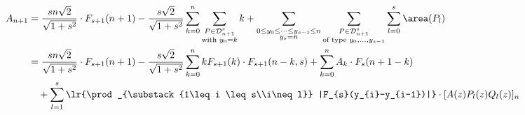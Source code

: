 \documentclass[12pt]{article}
\begin{document}
\begin{align*}
    A_{n+1} &= \frac{sn \sqrt{2}}{\sqrt{1+s^{2}}}\cdot F_{s+1}(n+1) - \frac{s \sqrt{2}}{\sqrt{1+s^{2}}}\sum_{k=0}^{n}\sum_{\substack{P\in \mathcal{D}_{n+1}^{s}\\\text{with }y_{0}=k}}k + \sum_{\substack{0\leq y_{0}\leq \cdots\leq y_{s-1}\leq n\\y_{s}=n}} \sum_{\substack{P\in \mathcal{D}_{n+1}^{s}\\\text{of type }y_{0},\ldots, y_{s-1}}}  \sum_{l=0}^{s}\area(P_{l})  \\
    &=\frac{sn \sqrt{2}}{\sqrt{1+s^{2}}}\cdot F_{s+1}(n+1)-\frac{s \sqrt{2}}{\sqrt{1+s^{2}}}\sum_{k=0}^{n}kF_{s+1}(k)\cdot F_{s+1}(n-k,s) + \sum_{k=0}^{n} A_{k}\cdot F_{s}(n+1-k) \\
    &\quad +\sum_{l=1}^{s}\lr{\prod_{\substack{1\leq i \leq s\\i\neq l}} |F_{s}(y_{i}-y_{i-1})|}\cdot[A(z)P_{l}(z) Q_{l}(z)]_{n} 
\end{align*}
\end{document}
